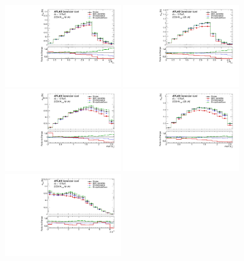 \begin{figure}[!htb]
\centering
\includegraphics[width=0.45\textwidth]{Plots/ttV/generator/c_Region_0_DRll01}
\includegraphics[width=0.45\textwidth]{Plots/ttV/generator/c_Region_1_DRll01}\\
\includegraphics[width=0.45\textwidth]{Plots/ttV/generator/c_Region_0_maxEta_ll} 
\includegraphics[width=0.45\textwidth]{Plots/ttV/generator/c_Region_1_maxEta_ll}\\
\includegraphics[width=0.45\textwidth]{Plots/ttV/generator/c_Region_0_lep_dPhi} 

\end{figure}
